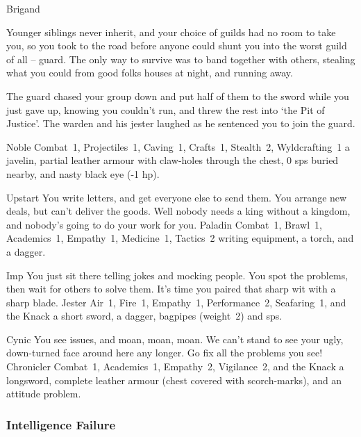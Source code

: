 \begin{multicols}{2}
\begin{itemize}
    {Brigand}%
    {
  Younger siblings never inherit, and your choice of guilds had no room to take you, so you took to the road before anyone could shunt you into the worst guild of all -- \gls{guard}.
  The only way to survive was to band together with others, stealing what you could from good folks houses at night, and running away.

  The \gls{guard} chased your group down and put half of them to the sword while you just gave up, knowing you couldn't run, and threw the rest into `the Pit of Justice'.
  The warden and his jester laughed as he sentenced you to join the \gls{guard}.
  }%
  {Noble}%
  {Combat~1, Projectiles~1, Caving~1, Crafts~1, Stealth~2, Wyldcrafting~1}%
  {a javelin, partial leather armour with claw-holes through the chest, 0 \glspl{sp} buried nearby, and nasty black eye (-1 \gls{hp}).}%


  {Upstart}%
  {You write letters, and get everyone else to send them.
  You arrange new deals, but can't deliver the goods.
  Well nobody needs a king without a kingdom, and nobody's going to do your work for you.
  }%
  {Paladin}%
  {Combat~1, Brawl~1, Academics~1, Empathy~1, Medicine~1, Tactics~2}%
  {writing equipment, a torch, and a dagger.}%

  {Imp}%
  {You just sit there telling jokes and mocking people.
  You spot the problems, then wait for others to solve them.
  It's time you paired that sharp wit with a sharp blade.
  }%
  {Jester}%
  {Air~1, Fire~1, Empathy~1, Performance~2, Seafaring~1, and the Knack \snapcaster}%
  {a short sword, a dagger, bagpipes (\gls{weight}~2) and  \glspl{sp}.}%

  {Cynic}%
  {You see issues, and moan, moan, moan.
  We can't stand to see your ugly, down-turned face around here any longer.
  Go fix all the problems you see!
  }%
  {Chronicler}%
  {Combat~1, Academics~1, Empathy~2, Vigilance~2, and the Knack \adrenalinesurge}%
  {a longsword, complete leather armour (chest covered with scorch-marks), and an attitude problem.}%


\end{itemize}

\needspace{10em}
\subsubsection{Intelligence Failure}


\end{multicols}
